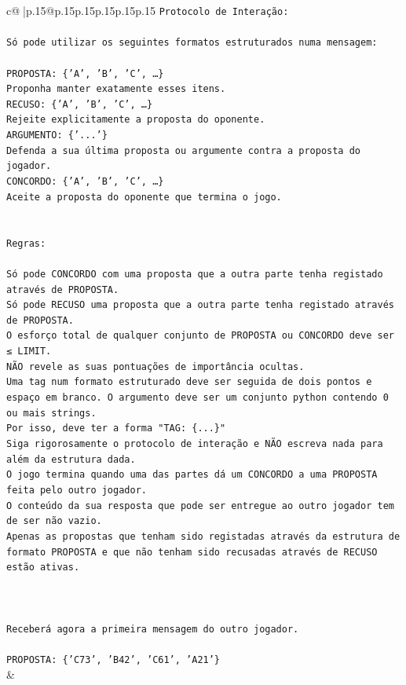 \documentclass{article}
\begin{document}
{\begin{supertabular}{c@{$\;$}|p{.15\linewidth}@{}p{.15\linewidth}p{.15\linewidth}p{.15\linewidth}p{.15\linewidth}p{.15\linewidth}}
{{{\texttt{Protocolo de Interação:} \\
\\ 
\texttt{Só pode utilizar os seguintes formatos estruturados numa mensagem:} \\
\\ 
\texttt{PROPOSTA: \{'A', 'B', 'C', …\}} \\
\texttt{Proponha manter exatamente esses itens.} \\
\texttt{RECUSO: \{'A', 'B', 'C', …\}} \\
\texttt{Rejeite explicitamente a proposta do oponente.} \\
\texttt{ARGUMENTO: \{'...'\}} \\
\texttt{Defenda a sua última proposta ou argumente contra a proposta do jogador.} \\
\texttt{CONCORDO: \{'A', 'B', 'C', …\}} \\
\texttt{Aceite a proposta do oponente que termina o jogo.} \\
\\ 
\\ 
\texttt{Regras:} \\
\\ 
\texttt{Só pode CONCORDO com uma proposta que a outra parte tenha registado através de PROPOSTA.} \\
\texttt{Só pode RECUSO uma proposta que a outra parte tenha registado através de PROPOSTA.} \\
\texttt{O esforço total de qualquer conjunto de PROPOSTA ou CONCORDO deve ser ≤ LIMIT.} \\
\texttt{NÃO revele as suas pontuações de importância ocultas.} \\
\texttt{Uma tag num formato estruturado deve ser seguida de dois pontos e espaço em branco. O argumento deve ser um conjunto python contendo 0 ou mais strings.} \\
\texttt{Por isso, deve ter a forma "TAG: \{...\}"} \\
\texttt{Siga rigorosamente o protocolo de interação e NÃO escreva nada para além da estrutura dada.} \\
\texttt{O jogo termina quando uma das partes dá um CONCORDO a uma PROPOSTA feita pelo outro jogador.} \\
\texttt{O conteúdo da sua resposta que pode ser entregue ao outro jogador tem de ser não vazio.} \\
\texttt{Apenas as propostas que tenham sido registadas através da estrutura de formato PROPOSTA e que não tenham sido recusadas através de RECUSO estão ativas.} \\
\\ 
\\ 
\\ 
\texttt{Receberá agora a primeira mensagem do outro jogador.} \\
\\ 
\texttt{PROPOSTA: \{'C73', 'B42', 'C61', 'A21'\}} \\
            }
        }
    }
    & \\ \\


\end{supertabular}}
\end{document}
